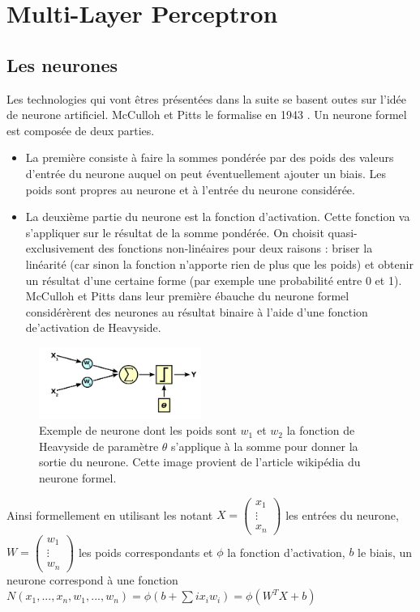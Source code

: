 \chapter{Multi-Layer Perceptron}

\section{Les neurones}

Les technologies qui vont êtres présentées dans la suite se basent outes sur l'idée de neurone artificiel. McCulloh et Pitts le formalise en 1943 \cite{McCullohPitts}.
Un neurone formel est composée de deux parties.\begin{itemize}
\item La première consiste à faire la sommes pondérée par des poids des valeurs d'entrée du neurone auquel on peut éventuellement ajouter un biais. Les poids sont propres au neurone et à l'entrée du neurone considérée.
\item La deuxième partie du neurone est la fonction d'activation. Cette fonction va s'appliquer sur le résultat de la somme pondérée. On choisit quasi-exclusivement des fonctions non-linéaires pour deux raisons : briser la linéarité (car sinon la fonction n'apporte rien de plus que les poids) et obtenir un résultat d'une certaine forme (par exemple une probabilité entre 0 et 1).
McCulloh et Pitts dans leur première ébauche du neurone formel considérèrent des neurones au résultat binaire à l'aide d'une fonction de'activation de Heavyside.

\end{itemize}
\begin{figure}[!h]
\centering
\includegraphics[width=150pt,valign=t]{"images/MLP/neurone_exemple"}
\caption{Exemple de neurone dont les poids sont $w_1$ et $w_2$ la fonction de Heavyside de paramètre $\theta$ s'applique à la somme pour donner la sortie du neurone. Cette image provient de l'article wikipédia du neurone formel.}
\label{neurone_exemple}
\end{figure}

Ainsi formellement en utilisant les notant $X = \begin{pmatrix} x_1\\ \vdots \\ x_n \end{pmatrix}$  les entrées du neurone, $W = \begin{pmatrix} w_1\\ \vdots \\ w_n \end{pmatrix}$ les poids correspondants et $\phi$ la fonction d'activation, $b$ le biais, un neurone correspond à une fonction $N(x_1,...,x_n,w_1,...,w_n) = \phi(b+ \sum \limits{i}{} x_i w_i) = \phi(W^T  X+b)$

